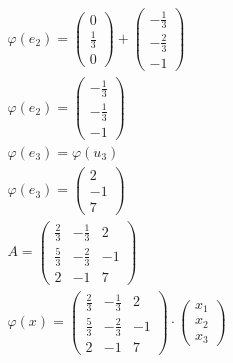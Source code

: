 \begin{align*}
    \varphi(e_2) = \begin{pmatrix}
                       0 \\ \frac{1}{3} \\ 0
                   \end{pmatrix} + \begin{pmatrix}
                                       -\frac{1}{3} \\ -\frac{2}{3} \\ -1
                                   \end{pmatrix}                  \\
    \varphi(e_2) = \begin{pmatrix}
                       -\frac{1}{3} \\ -\frac{1}{3} \\ -1
                   \end{pmatrix}                                  \\
    \varphi(e_3) = \varphi(u_3)                                                       \\
    \varphi(e_3) = \begin{pmatrix}
                       2 \\ -1 \\ 7
                   \end{pmatrix}                                                     \\
    A = \begin{pmatrix}
            \frac{2}{3} & -\frac{1}{3} & 2  \\
            \frac{5}{3} & -\frac{2}{3} & -1 \\
            2           & -1           & 7
        \end{pmatrix}                                               \\
    \varphi(x) = \begin{pmatrix}
                     \frac{2}{3} & -\frac{1}{3} & 2  \\
                     \frac{5}{3} & -\frac{2}{3} & -1 \\
                     2           & -1           & 7
                 \end{pmatrix} \cdot \begin{pmatrix}
                                         x_1 \\ x_2 \\ x_3
                                     \end{pmatrix}
\end{align*}

